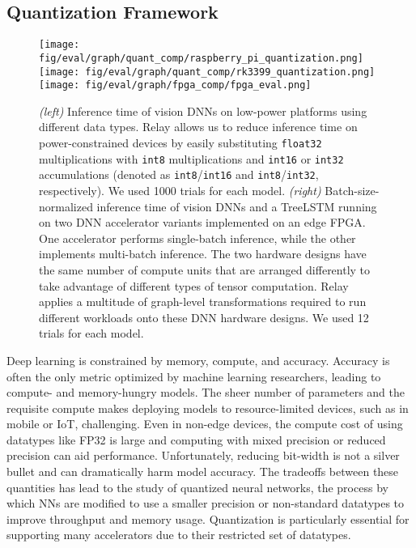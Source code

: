 \subsection{Quantization Framework}
\label{sec:quant}

\begin{figure*}[htbp!]
  \centering
  \texttt{[image: fig/eval/graph/quant\_comp/raspberry\_pi\_quantization.png]}
  \hspace{-0.075in}
  \texttt{[image: fig/eval/graph/quant\_comp/rk3399\_quantization.png]}
  \texttt{[image: fig/eval/graph/fpga\_comp/fpga\_eval.png]}
  \caption{\textmd{
    \textit{(left)} Inference time of vision DNNs on low-power platforms using
      different data types.
    Relay allows us to reduce inference time on power-constrained devices by
      easily substituting \texttt{float32} multiplications with \texttt{int8}
      multiplications and \texttt{int16} or \texttt{int32} accumulations (denoted
      as \texttt{int8}/\texttt{int16} and \texttt{int8}/\texttt{int32}, respectively).
    We used 1000 trials for each model.
    \textit{(right)}
    Batch-size-normalized inference time of vision DNNs and a TreeLSTM running on two DNN accelerator variants implemented on an edge FPGA.
    One accelerator performs single-batch inference, while the other implements multi-batch inference.
    The two hardware designs have the same number of compute units that are arranged differently to take advantage of different types of tensor computation.
    Relay applies a multitude of graph-level transformations required to run different workloads onto these DNN hardware designs.
    We used 12 trials for each model.
  }}
  \label{fig:portability-eval}
\end{figure*}

Deep learning is constrained by memory, compute, and accuracy.
Accuracy is often the only metric optimized by machine learning
  researchers, leading to compute- and memory-hungry models.
The sheer number of parameters and the requisite compute
  makes deploying models to resource-limited devices,
  such as in mobile or IoT, challenging.
Even in non-edge devices, the compute cost of using
  datatypes like FP32 is large and computing with mixed precision
  or reduced precision can aid performance.
Unfortunately, reducing bit-width is not a silver bullet and
  can dramatically harm model accuracy.
The tradeoffs between these quantities has lead to the study of quantized neural networks,
  the process by which NNs are modified to use a smaller precision
  or non-standard datatypes to improve throughput and memory usage.
Quantization is particularly essential for supporting many accelerators due to
  their restricted set of datatypes.

